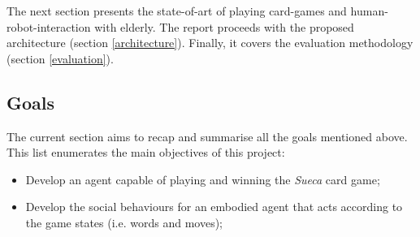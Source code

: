 
The next section presents the state-of-art of playing card-games and human-robot-interaction with elderly.
The report proceeds with the proposed architecture (section \ref{architecture}).
Finally, it covers the evaluation methodology (section \ref{evaluation}). 


\subsection{Goals}
The current section aims to recap and summarise all the goals mentioned above.
This list enumerates the main objectives of this project:
\begin{itemize}
\item Develop an agent capable of playing and winning the \emph{Sueca} card game;
\item Develop the social behaviours for an embodied agent that acts according to the game states (i.e. words and moves);
\end{itemize}
